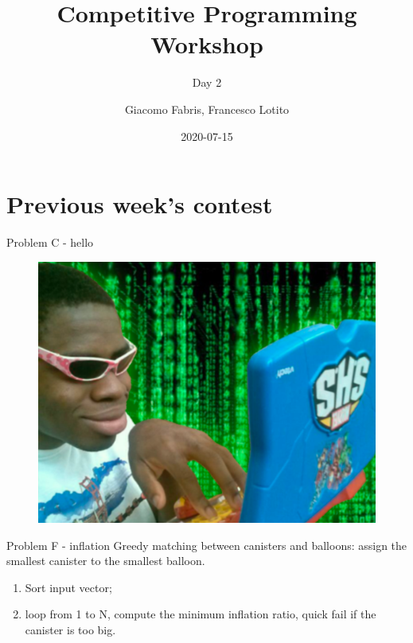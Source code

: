 \documentclass[compress]{beamer}
\title{Competitive Programming Workshop}
\subtitle{Day 2}
\author{Giacomo Fabris, Francesco Lotito}
\institute{University of Trento}
\date{2020-07-15}
\begin{document}
\begin{frame}
    \maketitle
\end{frame}

\begin{frame}
    \tableofcontents
\end{frame}

\section{Previous week's contest}

\begin{frame}{Problem C - hello}{}
    \begin{figure}
        \includegraphics[height=0.8\textheight]{meme1}
    \end{figure}
\end{frame}

\begin{frame}{Problem F - inflation}
    Greedy matching between canisters and balloons: assign the smallest canister to the smallest balloon.

    \begin{enumerate}
        \item Sort input vector;
        \item loop from 1 to N, compute the minimum inflation ratio, quick fail if the canister is too big.
    \end{enumerate}
\end{frame}
\end{document}
